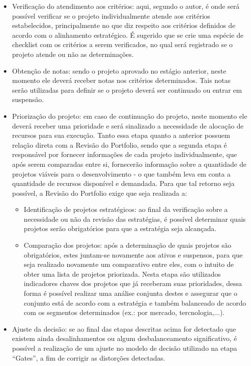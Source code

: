 \documentclass[12pt,a4paper,ruledheader,tocpage=prefix,floatnumber=continuous,pagestart=folhaderosto,font=times]{abnt}
\begin{document}
\begin{itemize}
 \item Verificação do atendimento aos critérios: aqui, segundo o autor, é onde será possível verificar se o projeto individualmente atende aos critérios
       estabelecidos, principalmente no que diz respeito aos critérios definidos de acordo com o alinhamento estratégico. É sugerido que se crie uma espécie
       de checklist com os critérios a serem verificados, no qual será registrado se o projeto atende ou não as determinações.
 \item Obtenção de notas: sendo o projeto aprovado no estágio anterior, neste momento ele deverá receber notas nos critérios determinados. Tais notas serão
       utilizadas para definir se o projeto deverá ser continuado ou entrar em suspensão.
 \item Priorização do projeto: em caso de continuação do projeto, neste momento ele deverá receber uma prioridade e será sinalizado a necessidade de alocação
       de recursos para sua execução. Tanto essa etapa quanto a anterior possuem relação direta com a Revisão do Portfolio, sendo que a segunda etapa é
       responsável por fornecer informações de cada projeto individualmente, que após serem comparadas entre si, fornecerão informação sobre a quantidade
       de projetos viáveis para o desenvolvimento - o que também leva em conta a quantidade de recursos disponível e demandada. Para que tal retorno seja
       possível, a Revisão do Portfolio exige que seja realizada a:
       \begin{itemize}
	  \item Identificação de projetos estratégicos: ao final da verificação sobre a necessidade ou não da revisão das estratégias, é possível determinar
		quais projetos serão obrigatórios para que a estratégia seja alcançada.
	  \item Comparação dos projetos: após a determinação de quais projetos são obrigatórios, estes juntam-se novamente aos ativos e suspensos, para
		que seja realizado novamente um comparativo entre eles, com o intuito de obter uma lista de projetos priorizada. Nesta etapa são utilizados
		indicadores chaves dos projetos que já receberam suas prioridades, dessa forma é possível realizar uma análise conjunta destes e assegurar
		que o conjunto está de acordo com a estratégia e também balanceado de acordo com os segmentos determinados (ex.: por mercado, tercnologia,...).
       \end{itemize}
  \item Ajuste da decisão: se ao final das etapas descritas acima for detectado que existem ainda desalinhamentos ou algum desbalanceamento significativo,
	é possível a realização de um ajuste no modelo de decisão utilizado na etapa ``Gates'', a fim de corrigir as distorções detectadas.
\end{itemize}
\end{document}
